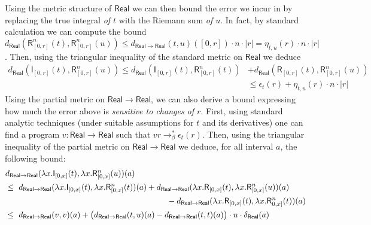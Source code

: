 \begin{example}
Using the metric structure of $\mathsf{Real}$ we can then bound the error we incur in by replacing the true integral \emph{of $t$} with the Riemann sum \emph{of $u$}. 
In fact, by standard calculation we can compute the bound
$d_{\mathsf{Real}} ( \mathsf{R}^{n}_{[0,r]}(t), \mathsf R^{n}_{[0,r]}(u))\leq 
d_{\mathsf{Real}\to\mathsf{Real}}(t, u)([0,r]) \cdot n \cdot |r|=\eta_{t,u}(r)\cdot n \cdot |r|$.
Then, using the triangular inequality of the standard metric on $\mathsf{Real}$ we deduce
\begin{align*}
 d_{\mathsf{Real}} ( \mathsf{I}_{[0,r]}(t), \mathsf R^{n}_{[0,r]}(u)) \leq
d_{\mathsf{Real}} ( \mathsf{I}_{[0,r]}(t), \mathsf R^{n}_{[0,r]}(t))  & +
d_{\mathsf{Real}} ( \mathsf{R}_{[0,r]}(t),\mathsf R^{n}_{[0,r]}(u)) \\
& \leq \epsilon_{t}(r)
+ 
\eta_{t,u}(r)\cdot 
 n\cdot |r|
 \end{align*}
 Using the partial metric on $\mathsf{Real}\to \mathsf{Real}$, we can also derive a bound expressing how much the error above is \emph{sensitive to changes of $r$}. 
First, using standard analytic techniques (under suitable assumptions for $t$ and its derivatives) one can find a program $v:\mathsf{Real}\to\mathsf{Real}$ such that $vr \to^{*}_{\beta}\epsilon_{t}(r)$. 
Then, using the triangular inequality of the partial metric on $\mathsf{Real}\to \mathsf{Real}$ we deduce, for all interval $a$, the following bound:
\begin{align*}
& d_{\mathsf{Real}\to\mathsf{Real}} (\lambda x. \mathsf{I}_{[0,x]}(t),\lambda x. \mathsf R^{n}_{[0,x]}(u))(a) \\
 &\leq \
d_{\mathsf{Real}\to\mathsf{Real}} ( \lambda x.\mathsf{I}_{[0,x]}(t), \lambda x.\mathsf R^{n}_{[0,x]}(t))(a) +
d_{\mathsf{Real}\to\mathsf{Real}} ( \lambda x.\mathsf{R}_{[0,x]}(t), \lambda x.\mathsf R^{n}_{[0,x]}(u))(a) \\
 & \qquad\qquad\qquad\qquad\qquad\qquad\qquad\qquad\qquad\qquad
- d_{\mathsf{Real}\to\mathsf{Real}} ( \lambda x.\mathsf{R}_{[0,x]}(t), \allowbreak \lambda x. \mathsf R^{n}_{0,x]}(t))(a) \\
 & \leq \ 
d_{\mathsf{Real}\to \mathsf{Real}}(v,v)(a)
 +
 \big( d_{\mathsf{Real}\to\mathsf{Real}}(t,u)(a)- d_{\mathsf{Real}\to\mathsf{Real}}(t,t)(a)\big)\cdot n\cdot \diam_{\mathsf{Real}}(a)
\end{align*}
\end{example}



